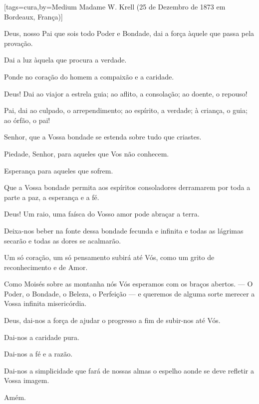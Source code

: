 \sclearpage
{}[tags={cura},by={Medium Madame W. Krell (25 de Dezembro de 1873 em Bordeaux, França)}]
  \begin{passage}[PT]{}
    Deus, nosso Pai que sois todo Poder e Bondade, dai
    a força àquele que passa pela provação.
    \par
    Dai a luz àquela que procura a verdade.
    \par
    Ponde no coração do homem a compaixão e a caridade.
    \par
    Deus! Dai ao viajor a estrela guia; ao aflito,
    a consolação; ao doente, o repouso!
    \par
    Pai, dai ao culpado, o arrependimento; ao espírito,
    a verdade; à criança, o guia; ao órfão, o pai!
    \par
    Senhor, que a Vossa bondade se estenda sobre tudo
    que criastes.
    \par
    Piedade, Senhor, para aqueles que Vos não conhecem.
    \par
    Esperança para aqueles que sofrem.
    \par
    Que a Vossa bondade permita aos espíritos
    consoladores derramarem por toda a parte a paz, a
    esperança e a fé.
    \par
    Deus! Um raio, uma faísca do Vosso amor pode abraçar
    a terra.
    \par
    Deixa-nos beber na fonte dessa bondade fecunda
    e infinita e todas as lágrimas secarão e todas as
    dores se acalmarão.
    \par
    Um só coração, um só pensamento subirá até Vós,
    como um grito de reconhecimento e de Amor.
    \par
    Como Moisés sobre as montanha nós Vós esperamos
    com os braços abertos. ---
    O Poder, o Bondade, o Beleza, o Perfeição ---
    e queremos de alguma sorte merecer a Vossa infinita
    misericórdia.
    \par
    Deus, dai-nos a força de ajudar o progresso a fim
    de subir-nos até Vós.
    \par
    Dai-nos a caridade pura.
    \par
    Dai-nos a fé e a razão.
    \par
    Dai-nos a simplicidade que fará de nossas almas o
    espelho aonde se deve refletir a Vossa imagem.
    \par
    Amém.
  \end{passage}
